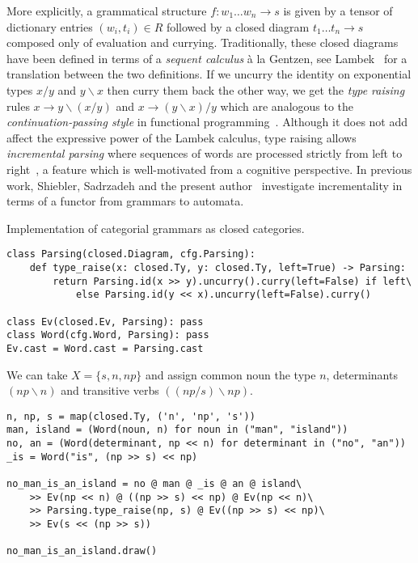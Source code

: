More explicitly, a grammatical structure $f : w_1 \dots w_n \to s$ is given by a tensor of dictionary entries $(w_i, t_i) \in R$ followed by a closed diagram $t_1 \dots t_n \to s$ composed only of evaluation and currying.
Traditionally, these closed diagrams have been defined in terms of a \emph{sequent calculus} à la Gentzen, see Lambek~\cite{Lambek88} for a translation between the two definitions.
If we uncurry the identity on exponential types $x / y$ and $y \backslash x$ then curry them back the other way, we get the \emph{type raising} rules $x \to y \backslash (x / y)$ and $x \to (y \backslash x) / y$ which are analogous to the \emph{continuation-passing style} in functional programming~\cite{DeGroote01}.
Although it does not add affect the expressive power of the Lambek calculus, type raising allows \emph{incremental parsing} where sequences of words are processed strictly from left to right~\cite{Dowty88,Steedman91}, a feature which is well-motivated from a cognitive perspective.
In previous work, Shiebler, Sadrzadeh and the present author~\cite{ShieblerEtAl20} investigate incrementality in terms of a functor from grammars to automata.

\begin{python}
{\normalfont Implementation of categorial grammars as closed categories.}

\begin{verbatim}
class Parsing(closed.Diagram, cfg.Parsing):
    def type_raise(x: closed.Ty, y: closed.Ty, left=True) -> Parsing:
        return Parsing.id(x >> y).uncurry().curry(left=False) if left\
            else Parsing.id(y << x).uncurry(left=False).curry()

class Ev(closed.Ev, Parsing): pass
class Word(cfg.Word, Parsing): pass
Ev.cast = Word.cast = Parsing.cast
\end{verbatim}
\end{python}

\begin{example}
We can take $X = \{ s, n, np \}$ and assign common noun the type $n$, determinants $(np \backslash n)$ and transitive verbs $((np / s) \backslash np)$.

\begin{verbatim}
n, np, s = map(closed.Ty, ('n', 'np', 's'))
man, island = (Word(noun, n) for noun in ("man", "island"))
no, an = (Word(determinant, np << n) for determinant in ("no", "an"))
_is = Word("is", (np >> s) << np)

no_man_is_an_island = no @ man @ _is @ an @ island\
    >> Ev(np << n) @ ((np >> s) << np) @ Ev(np << n)\
    >> Parsing.type_raise(np, s) @ Ev((np >> s) << np)\
    >> Ev(s << (np >> s))

no_man_is_an_island.draw()
\end{verbatim}
\end{example}

